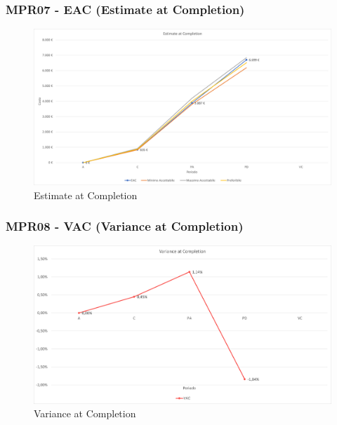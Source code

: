 \subsubsection{MPR07 - EAC (Estimate at Completion)}
\begin{figure}[!ht]
    \caption{Estimate at Completion}
    \vspace{10px}
    \includegraphics[scale=0.5]{sezioni/immagini/EstimateAtCompletion.png}
    \centering
\end{figure}
\subsubsection{MPR08 - VAC (Variance at Completion)}
\begin{figure}[!ht]
    \caption{Variance at Completion}
    \vspace{10px}
    \includegraphics[scale=0.5]{sezioni/immagini/VarianceAtCompletion.png}
    \centering
\end{figure}
\pagebreak
